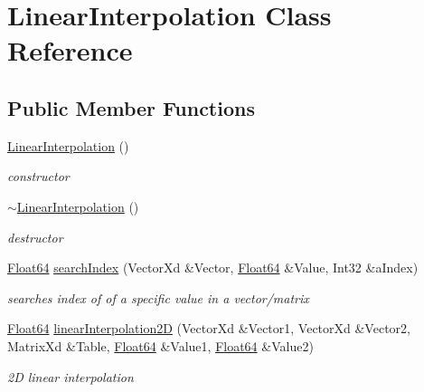 \hypertarget{class_linear_interpolation}{}\section{Linear\+Interpolation Class Reference}
\label{class_linear_interpolation}
\subsection*{Public Member Functions}
\begin{DoxyCompactItemize}
\item 
\mbox{\label{class_linear_interpolation_aaae2ec77e7767bb5fc7ca34a6e1197f1}} 
\hyperlink{class_linear_interpolation_aaae2ec77e7767bb5fc7ca34a6e1197f1}{Linear\+Interpolation} ()
\begin{DoxyCompactList}\small\item\em constructor \end{DoxyCompactList}\item 
\mbox{\label{class_linear_interpolation_a36a34fa39c430e05bdc073c1ac9ad4df}} 
\hyperlink{class_linear_interpolation_a36a34fa39c430e05bdc073c1ac9ad4df}{$\sim$\+Linear\+Interpolation} ()
\begin{DoxyCompactList}\small\item\em destructor \end{DoxyCompactList}\item 
\hyperlink{group___tools_ga3f1431cb9f76da10f59246d1d743dc2c}{Float64} \hyperlink{class_linear_interpolation_aa9faf7177964de6d3b68a69cdbf7ef1a}{search\+Index} (Vector\+Xd \&Vector, \hyperlink{group___tools_ga3f1431cb9f76da10f59246d1d743dc2c}{Float64} \&Value, Int32 \&a\+Index)
\begin{DoxyCompactList}\small\item\em searches index of of a specific value in a vector/matrix \end{DoxyCompactList}\item 
\hyperlink{group___tools_ga3f1431cb9f76da10f59246d1d743dc2c}{Float64} \hyperlink{class_linear_interpolation_aaf48c1f0fa673ada9b8d6218690161f4}{linear\+Interpolation2D} (Vector\+Xd \&Vector1, Vector\+Xd \&Vector2, Matrix\+Xd \&Table, \hyperlink{group___tools_ga3f1431cb9f76da10f59246d1d743dc2c}{Float64} \&Value1, \hyperlink{group___tools_ga3f1431cb9f76da10f59246d1d743dc2c}{Float64} \&Value2)
\begin{DoxyCompactList}\small\item\em 2D linear interpolation \end{DoxyCompactList}\item 

\end{DoxyCompactItemize}
